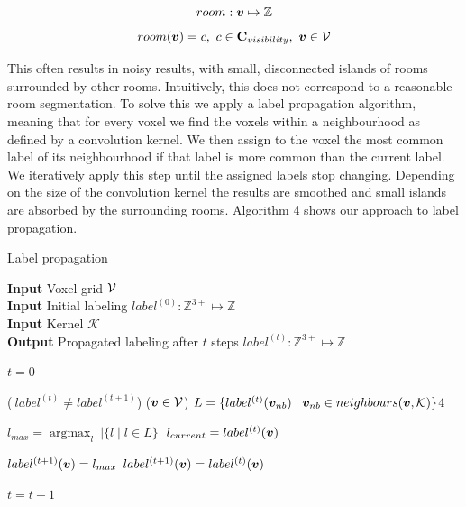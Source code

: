 \begin{equation}
    \label{eq:room_01}
room: \boldsymbol{v} \mapsto \mathbb{Z}
\end{equation}
\begin{equation}
    \label{eq:room_02}
room(\boldsymbol{v}) = c,\ c \in \mathbf{C}_{visibility},\ \boldsymbol{v} \in \mathcal{V}
\end{equation}

This often results in noisy results, with small, disconnected islands of rooms surrounded by other rooms. Intuitively, this does not correspond to a reasonable room segmentation. To solve this we apply a label propagation algorithm, meaning that for every voxel we find the voxels within a neighbourhood as defined by a convolution kernel. We then assign to the voxel the most common label of its neighbourhood if that label is more common than the current label. We iteratively apply this step until the assigned labels stop changing. Depending on the size of the convolution kernel the results are smoothed and small islands are absorbed by the surrounding rooms. Algorithm 4 shows our approach to label propagation.

\pagebreak

\begin{algorithm}
    \caption{Label propagation}
    \hspace*{\algorithmicindent} \textbf{Input} Voxel grid \(\mathcal{V}\) \\
    \hspace*{\algorithmicindent} \textbf{Input} Initial labeling \(label^{(0)}: \mathbb{Z}^{3+} \mapsto \mathbb{Z}\) \\
    \hspace*{\algorithmicindent} \textbf{Input}  Kernel \(\mathcal{K}\) \\
    \hspace*{\algorithmicindent} \textbf{Output} Propagated labeling after \(t\) steps \(label^{(t)}: \mathbb{Z}^{3+} \mapsto \mathbb{Z}\) \\

    \begin{algorithmic}
    \label{algo:label_prop}
    \State $t=0$

    \While($\ label^{(t)} \neq label^{(t+1)}$) 
        \ForEach($\boldsymbol{v} \in \mathcal{V}$)
            \State $L = \{label^{(t)}(\boldsymbol{v}_{nb}) \mid \boldsymbol{v}_{nb} \in neighbours(\boldsymbol{v}, \mathcal{K})\}$4

            \State $l_{max} = \mathop{argmax}_{l} \ |\{l \mid l \in L\}|$ 
            \State $l_{current} = label^{(t)}(\boldsymbol{v})$  

                \State \(label^{(t+1)}(\boldsymbol{v}) = l_{max}\)
            \Else
                \State \(label^{(t+1)}(\boldsymbol{v}) = label^{(t)}(\boldsymbol{v})\)
            \EndIf
        \EndFor

        \State $t = t+1$ 
    \EndWhile
    \end{algorithmic}
\end{algorithm}

